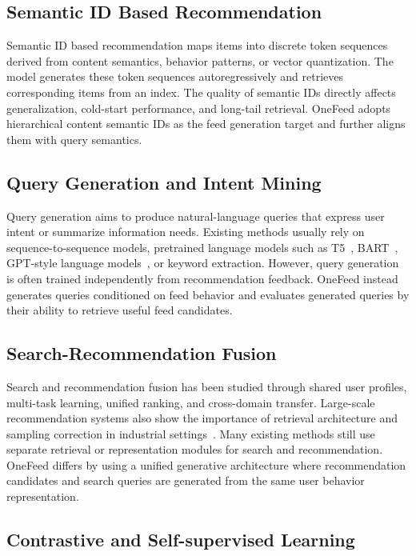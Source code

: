 \documentclass[11pt]{article}
\begin{document}
\subsection{Semantic ID Based Recommendation}

Semantic ID based recommendation maps items into discrete token sequences derived from content semantics, behavior patterns, or vector quantization. The model generates these token sequences autoregressively and retrieves corresponding items from an index. The quality of semantic IDs directly affects generalization, cold-start performance, and long-tail retrieval. OneFeed adopts hierarchical content semantic IDs as the feed generation target and further aligns them with query semantics.

\subsection{Query Generation and Intent Mining}

Query generation aims to produce natural-language queries that express user intent or summarize information needs. Existing methods usually rely on sequence-to-sequence models, pretrained language models such as T5~\cite{raffel2020t5}, BART~\cite{lewis2020bart}, GPT-style language models~\cite{radford2019gpt2}, or keyword extraction. However, query generation is often trained independently from recommendation feedback. OneFeed instead generates queries conditioned on feed behavior and evaluates generated queries by their ability to retrieve useful feed candidates.

\subsection{Search-Recommendation Fusion}

Search and recommendation fusion has been studied through shared user profiles, multi-task learning, unified ranking, and cross-domain transfer. Large-scale recommendation systems also show the importance of retrieval architecture and sampling correction in industrial settings~\cite{covington2016youtube,yi2019mnas}. Many existing methods still use separate retrieval or representation modules for search and recommendation. OneFeed differs by using a unified generative architecture where recommendation candidates and search queries are generated from the same user behavior representation.

\subsection{Contrastive and Self-supervised Learning}
\end{document}
